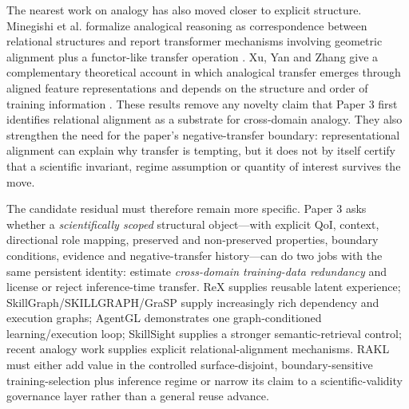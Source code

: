 The nearest work on analogy has also moved closer to explicit structure. Minegishi et al. formalize analogical reasoning as correspondence between relational structures and report transformer mechanisms involving geometric alignment plus a functor-like transfer operation \cite{minegishi2026analogy}. Xu, Yan and Zhang give a complementary theoretical account in which analogical transfer emerges through aligned feature representations and depends on the structure and order of training information \cite{xu2026feature}. These results remove any novelty claim that Paper 3 first identifies relational alignment as a substrate for cross-domain analogy. They also strengthen the need for the paper's negative-transfer boundary: representational alignment can explain why transfer is tempting, but it does not by itself certify that a scientific invariant, regime assumption or quantity of interest survives the move.

The candidate residual must therefore remain more specific. Paper 3 asks whether a \emph{scientifically scoped} structural object---with explicit QoI, context, directional role mapping, preserved and non-preserved properties, boundary conditions, evidence and negative-transfer history---can do two jobs with the same persistent identity: estimate \emph{cross-domain training-data redundancy} and license or reject inference-time transfer. ReX supplies reusable latent experience; SkillGraph/SKILLGRAPH/GraSP supply increasingly rich dependency and execution graphs; AgentGL demonstrates one graph-conditioned learning/execution loop; SkillSight supplies a stronger semantic-retrieval control; recent analogy work supplies explicit relational-alignment mechanisms. RAKL must either add value in the controlled surface-disjoint, boundary-sensitive training-selection plus inference regime or narrow its claim to a scientific-validity governance layer rather than a general reuse advance.
